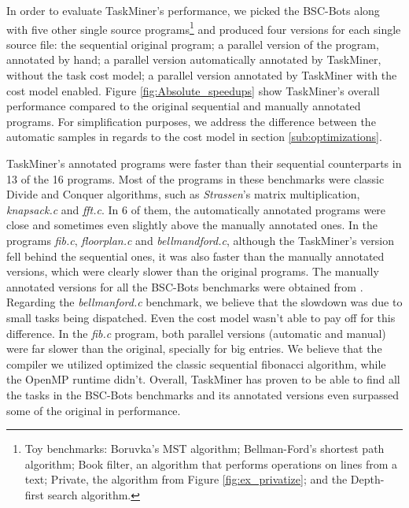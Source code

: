 \documentclass[sigplan,10pt,review,anonymous]{acmart}
\newcommand\Taskminer{\mbox{\textsf{TaskMiner}}}
\begin{document}
In order to evaluate {\Taskminer}'s performance, we picked the \textsf{BSC-Bots} along with
five other single source programs\footnote{Toy benchmarks: Boruvka's MST algorithm;
Bellman-Ford's shortest path algorithm; Book filter, an algorithm that performs operations on lines from
a text; Private, the algorithm from Figure \ref{fig:ex_privatize}; and the Depth-first search algorithm.}
and produced four versions for each single source file: the sequential original program; a parallel version
of the program, annotated by hand; a parallel version automatically annotated by {\Taskminer}, without
the task cost model; a parallel version annotated by {\Taskminer} with the cost model enabled. Figure
\ref{fig:Absolute_speedups} show {\Taskminer}'s overall performance compared to the original
sequential and manually annotated programs. For simplification purposes, we address
the difference between the automatic samples in regards to the cost model in section
\ref{sub:optimizations}.

{\Taskminer}'s annotated programs were faster than their sequential counterparts in 13 of the 16
programs. Most of the programs in these benchmarks were classic Divide and Conquer algorithms, such as \textit{Strassen}'s matrix multiplication, \textit{knapsack.c} and \textit{fft.c}.
In 6 of them, the automatically annotated programs were close and sometimes even slightly
above the manually annotated ones. In the programs \textit{fib.c}, \textit{floorplan.c} and
\textit{bellmandford.c}, although the
{\Taskminer}'s version fell behind the sequential ones, it was also faster than the manually annotated
versions, which were clearly slower than the original programs. The manually annotated versions for all
the \textsf{BSC-Bots} benchmarks were obtained from \cite{Duran09}. Regarding the \textit{bellmanford.c}
benchmark, we believe that the slowdown was due to small tasks being dispatched. Even the cost model
wasn't able to pay off for this difference.
In the \textit{fib.c} program, both parallel versions (automatic and manual) were far slower than
the original, specially for big entries. We believe that the compiler we utilized optimized the
classic sequential fibonacci algorithm, while the \textsf{OpenMP} runtime didn't.
Overall, {\Taskminer} has proven to be able to find all the tasks in the \textsf{BSC-Bots} benchmarks and
its annotated versions even surpassed some of the original in performance.


\end{document}
